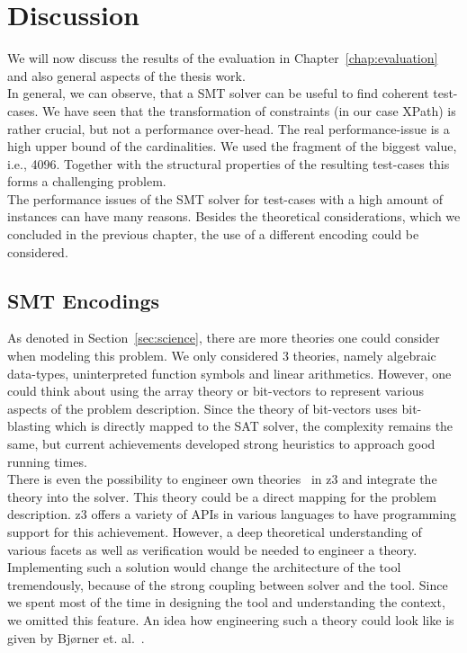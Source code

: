 \chapter{Discussion}\label{chap:discussion}

We will now discuss the results of the evaluation in Chapter~\ref{chap:evaluation} and also general aspects of the thesis work.\\

In general, we can observe, that a SMT solver can be useful to find coherent test-cases. We have seen that the transformation of constraints (in our case XPath) is rather crucial, but not a performance over-head. The real performance-issue is a high upper bound of the cardinalities. We used the fragment of the biggest value, i.e., 4096. Together with the structural properties of the resulting test-cases this forms a challenging problem.\\

The performance issues of the SMT solver for test-cases with a high amount of instances can have many reasons. Besides the theoretical considerations, which we concluded in the previous chapter, the use of a different encoding could be considered. 




\section{SMT Encodings}\label{sec:encoding}

As denoted in Section~\ref{sec:science}, there are more theories one could consider when modeling this problem. We only considered 3 theories, namely algebraic data-types, uninterpreted function symbols and linear arithmetics. However, one could think about using the array theory or bit-vectors to represent various aspects of the problem description. Since the theory of bit-vectors uses bit-blasting which is directly mapped to the SAT solver, the complexity remains the same, but current achievements developed strong heuristics to approach good running times.\\ 


There is even the possibility to engineer own theories~\cite{theroies-z3} in z3 and integrate the theory into the solver. This theory could be a direct mapping for the problem description. z3 offers a variety of APIs in various languages to have programming support for this achievement. However, a deep theoretical understanding of various facets as well as verification would be needed to engineer a theory. Implementing such a solution would change the architecture of the tool tremendously, because of the strong coupling between solver and the tool. Since we spent most of the time in designing the tool and understanding the context, we omitted this feature. An idea how engineering such a theory could look like is given by Bj{\o}rner et. al.~\cite{theroies-z3}.




